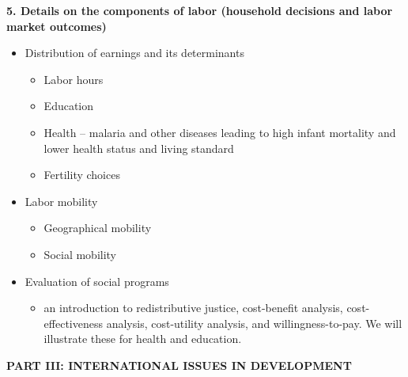 \documentclass[11pt,pdftex]{article}
\begin{document}
\begin{description}
\item  \textbf{5. Details on the components of labor (household decisions
and labor market outcomes)}

\begin{itemize}
\item  Distribution of earnings and its determinants

\begin{itemize}
\item  Labor hours

\item  Education

\item  Health -- malaria and other diseases leading to high infant mortality
and lower health status and living standard

\item  Fertility choices
\end{itemize}

\item  Labor mobility

\begin{itemize}
\item  Geographical mobility

\item  Social mobility
\end{itemize}

\item  Evaluation of social programs

\begin{itemize}
\item  an introduction to redistributive justice, cost-benefit analysis,
cost-effectiveness analysis, cost-utility analysis, and willingness-to-pay.
We will illustrate these for health and education.
\end{itemize}
\end{itemize}
\end{description}

\textbf{PART III: INTERNATIONAL ISSUES IN DEVELOPMENT}
\end{document}
